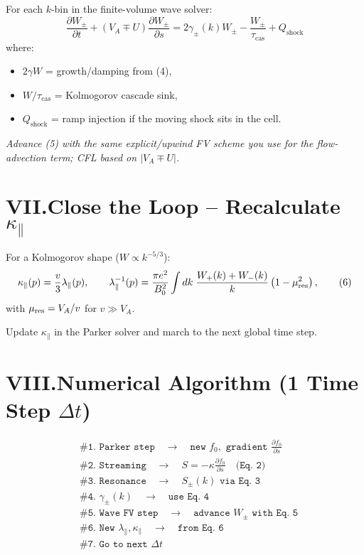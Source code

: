 For each $k$-bin in the finite-volume wave solver:
\[
\boxed{
\frac{\partial W_\pm}{\partial t}
+ (V_A \mp U) \frac{\partial W_\pm}{\partial s}
= 2\gamma_\pm(k) W_\pm
- \frac{W_\pm}{\tau_{\text{cas}}}
+ Q_{\text{shock}}
}
\tag{5}
\]
where:
\begin{itemize}
\item $2\gamma W$ = growth/damping from (4),
\item $W / \tau_{\text{cas}}$ = Kolmogorov cascade sink,
\item $Q_{\text{shock}}$ = ramp injection if the moving shock sits in the cell.
\end{itemize}

\noindent
\textit{Advance (5) with the same explicit/upwind FV scheme you use for the flow‐advection term; CFL based on $|V_A \mp U|$.}

\section*{VII.\quad Close the Loop – Recalculate $\kappa_\parallel$}

For a Kolmogorov shape ($W \propto k^{-5/3}$):
\[
\kappa_\parallel(p) = \frac{v}{3} \lambda_\parallel(p), \qquad
\lambda_\parallel^{-1}(p) =
\frac{\pi e^2}{B_0^2}
\int dk\;
\frac{W_+(k) + W_-(k)}{k}
\left( 1 - \mu_{\rm res}^2 \right),
\tag{6}
\]
with $\mu_{\rm res} = V_A / v$ for $v \gg V_A$.

\noindent
Update $\kappa_\parallel$ in the Parker solver and march to the next global time step.

\section*{VIII.\quad Numerical Algorithm (1 Time Step $\Delta t$)}

\[
\begin{aligned}
&\texttt{\# 1. Parker step} \quad \rightarrow \quad \texttt{new } f_0, \texttt{ gradient } \frac{\partial f_0}{\partial s} \\
&\texttt{\# 2. Streaming} \quad \rightarrow \quad S = -\kappa \frac{\partial f_0}{\partial s} \quad \texttt{(Eq. 2)} \\
&\texttt{\# 3. Resonance} \quad \rightarrow \quad S_{\pm}(k) \texttt{ via Eq. 3} \\
&\texttt{\# 4. } \gamma_{\pm}(k) \quad \rightarrow \quad \texttt{use Eq. 4} \\
&\texttt{\# 5. Wave FV step} \quad \rightarrow \quad \texttt{advance } W_{\pm} \texttt{ with Eq. 5} \\
&\texttt{\# 6. New } \lambda_{\parallel}, \kappa_{\parallel} \quad \rightarrow \quad \texttt{from Eq. 6} \\
&\texttt{\# 7. Go to next } \Delta t
\end{aligned}
\]


